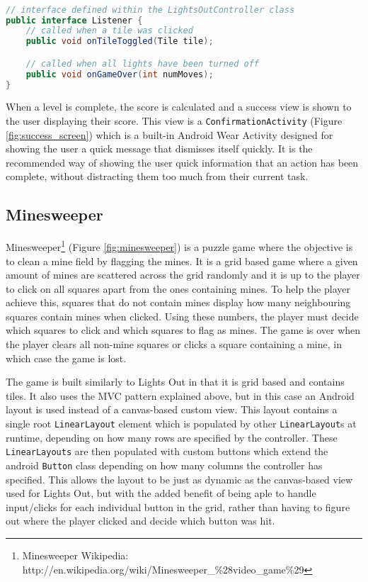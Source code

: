 \begin{lstlisting}[language=Java]

// interface defined within the LightsOutController class
public interface Listener {
    // called when a tile was clicked
    public void onTileToggled(Tile tile);

    // called when all lights have been turned off
    public void onGameOver(int numMoves);
}

\end{lstlisting}

When a level is complete, the score is calculated and a success view is shown
to the user displaying their score. This view is a \texttt{ConfirmationActivity}
(Figure \ref{fig:success_screen})
which is a built-in Android Wear Activity designed for showing the user a quick
message that dismisses itself quickly. It is the recommended way of showing the
user quick information that an action has been complete, without distracting
them too much from their current task.

\subsection{Minesweeper}

Minesweeper\footnote{Minesweeper Wikipedia: http://en.wikipedia.org/wiki/Minesweeper\_\%28video\_game\%29}
(Figure \ref{fig:minesweeper}) is a puzzle game where the objective is to clean
a mine field by flagging the mines. It is a grid based game where a given amount
of mines are scattered across the grid randomly and it is up to the player to
click on all squares apart from the ones containing mines. To help the player
achieve this, squares that do not contain mines display how many neighbouring
squares contain mines when clicked. Using these numbers, the player must decide
which squares to click and which squares to flag as mines. The game is over when
the player clears all non-mine squares or clicks a square containing a mine, in
which case the game is lost.

The game is built similarly to Lights Out in that it is grid based and contains
tiles. It also uses the MVC pattern explained above, but in this case an Android
layout is used instead of a canvas-based custom view. This layout contains a
single root \texttt{LinearLayout} element which is populated by other 
\texttt{LinearLayout}s at runtime, depending on how many rows are specified by
the controller. These \texttt{LinearLayouts} are then populated with custom
buttons which extend the android \texttt{Button} class depending on how many
columns the controller has specified. This allows the layout to be just as
dynamic as the canvas-based view used for Lights Out, but with the added benefit
of being aple to handle input/clicks for each individual button in the grid,
rather than having to figure out where the player clicked and decide which
button was hit.

